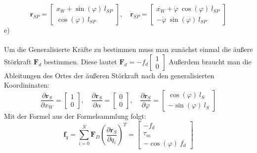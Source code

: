 \[\textbf{r}_{SP} = \begin{bmatrix} x_W + \sin{(\varphi)}\ l_{SP}  \\ \cos{(\varphi)}\ l_{SP}\end{bmatrix},\quad  \dot{\textbf{r}}_{SP}=\begin{bmatrix}
  \dot{x_W} + \dot{\varphi}\ \cos{(\varphi)}\ l_{SP}  \\ -\dot{\varphi}\ \sin{(\varphi)}\ l_{SP}
\end{bmatrix}\]
e) \\\\
\noindent
Um die Generalisierte Kräfte zu bestimmen muss man zunächst einmal die äußere Störkraft \(\textbf{F}_d\) bestimmen. Diese lautet \(\textbf{F}_d=-f_d \begin{bmatrix}
  1 \\ 0
\end{bmatrix}\) Außerdem braucht man die Ableitungen des Ortes der äußeren Störkraft nach den generalisierten Koordininaten:
\[ \frac{\partial \textbf{r}_S}{\partial x_W} = \begin{bmatrix}
  1 \\ 0
\end{bmatrix}, \quad \frac{\partial \textbf{r}_S}{\partial \alpha }  = \begin{bmatrix}
  0 \\ 0
\end{bmatrix}, \quad \frac{\partial \textbf{r}_S}{\partial \varphi} = \begin{bmatrix}
  \cos(\varphi)\ l_S \\ - \sin(\varphi)\ l_S
\end{bmatrix}\]
Mit der Formel aus der Formelsammlung folgt:
\[\textbf{f}_q = \sum_{i=0}^N \textbf{F}_D \left(\frac{\partial \textbf{r}_S}{\partial q_i}\right)^T = \begin{bmatrix}
  -f_d \\ \tau_m \\ -\cos(\varphi)\ f_d
\end{bmatrix}\]
